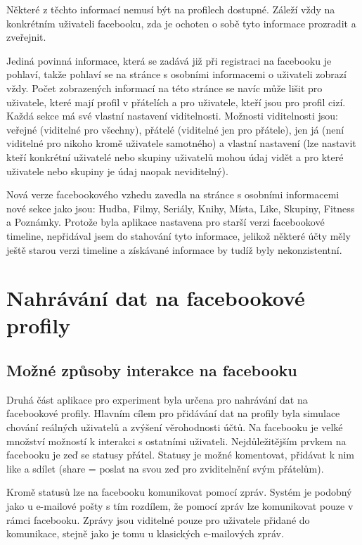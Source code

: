 \documentclass[thesis=M,czech]{FITthesis}[2013/05/10]
\begin{document}
Některé z těchto informací nemusí být na profilech dostupné. Záleží vždy na konkrétním uživateli facebooku, zda je ochoten o sobě tyto informace prozradit a zveřejnit.

Jediná povinná informace, která se zadává již při registraci na facebooku je pohlaví, takže pohlaví se na stránce s osobními informacemi o uživateli zobrazí vždy. Počet zobrazených informací na této stránce se navíc může lišit pro uživatele, které mají profil v přátelích a pro uživatele, kteří jsou pro profil cizí. Každá sekce má své vlastní nastavení viditelnosti. Možnosti viditelnosti jsou: veřejné (viditelné pro všechny), přátelé (viditelné jen pro přátele), jen já (není viditelné pro nikoho kromě uživatele samotného) a vlastní nastavení (lze nastavit kteří konkrétní uživatelé nebo skupiny uživatelů mohou údaj vidět a pro které uživatele nebo skupiny je údaj naopak neviditelný).

Nová verze facebookového vzhedu zavedla na stránce s osobními informacemi nové sekce jako jsou: Hudba, Filmy, Seriály, Knihy, Místa, Like, Skupiny, Fitness a Poznámky. Protože byla aplikace nastavena pro starší verzi facebookové timeline, nepřidával jsem do stahování tyto informace, jelikož některé účty měly ještě starou verzi timeline a získávané informace by tudíž byly nekonzistentní.

\section{Nahrávání dat na facebookové profily}

\subsection{Možné způsoby interakce na facebooku}

Druhá část aplikace pro experiment byla určena pro nahrávání dat na facebookové profily. Hlavním cílem pro přidávání dat na profily byla simulace chování reálných uživatelů a zvýšení věrohodnosti účtů. Na facebooku je velké množství možností k interakci s ostatními uživateli. Nejdůležitějším prvkem na facebooku je zeď se statusy přátel. Statusy je možné komentovat, přidávat k nim like a sdílet (share = poslat na svou zeď pro zviditelnění svým přátelům). 

Kromě statusů lze na facebooku komunikovat pomocí zpráv. Systém je podobný jako u e-mailové pošty s tím rozdílem, že pomocí zpráv lze komunikovat pouze  v rámci facebooku. Zprávy jsou viditelné pouze pro uživatele přidané do komunikace, stejně jako je tomu u klasických e-mailových zpráv. 
\end{document}
